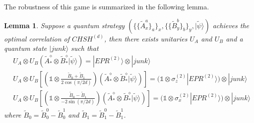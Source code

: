 \documentclass[11pt,letterpaper]{article}
\newcommand{\ket}[1]{|#1\rangle}
\newcommand{\x}{\otimes}
\newcommand{\1}{\mathbb{1}}
\newcommand{\CHSH}{CHSH^{(d)}}
\newcommand{\EPR}[1]{EPR^{(#1)}}
\newcommand{\paulix}[1]{\sigma_x^{(#1)}}
\newcommand{\pauliz}[1]{\sigma_z^{(#1)}}
\newcommand{\tA}{\tilde{A}}
\newcommand{\tB}{\tilde{B}}
\newcommand{\tpsi}{\tilde{\psi}}
\newtheorem{lemma}[theorem]{Lemma}
\theoremstyle{definition}
\begin{document}
The robustness of this game is summarized in the following lemma.
\begin{lemma}
	\label{lm:chsh_comp}
	Suppose a quantum strategy $\left(\{\{\tA_x^a\}_a\}_x, \{\{\tB_y^b\}_b\}_y, \ket{\tpsi}\right)$
	achieves the optimal correlation of $\CHSH$, then there exists unitaries $U_A$ and $U_B$ 
	and a quantum state $\ket{junk}$
	such that 
	\begin{align*}
		&U_A\x U_B \left(\tA_\ast^\diamond \x \tB_\ast^\diamond \ket{\tpsi}\right) = \ket{\EPR{2}}\x \ket{junk} \\
		&U_A\x U_B \left[\left(\1 \x  \frac{\tB_0 + \tB_1}{2\cos(\pi/2d)}\right)\left(\tA_\ast^\diamond \x \tB_\ast^\diamond \ket{\tpsi}\right) \right]
		=(\1 \x \pauliz{2} \ket{\EPR{2}}) \x \ket{junk} \\
		&U_A\x U_B \left[\left(\1 \x  \frac{\tB_0 - \tB_1}{-2\sin(\pi/2d)}\right)\left(\tA_\ast^\diamond \x \tB_\ast^\diamond \ket{\tpsi}\right) \right]
		=(\1 \x \paulix{2} \ket{\EPR{2}}) \x \ket{junk} 
	\end{align*}
	where $\tB_0 = \tB_0^0 - \tB_0^1$ and $\tB_1 = \tB_1^0 - \tB_1^1$.
\end{lemma}
\end{document}
